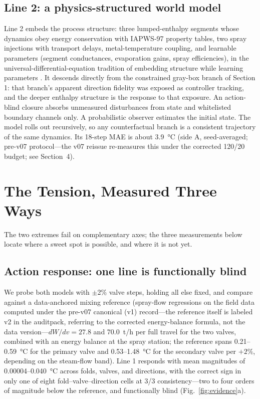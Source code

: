 \documentclass{article}
\begin{document}
\subsection{Line 2: a physics-structured world model}

Line 2 embeds the process structure: three lumped-enthalpy segments whose dynamics
obey energy conservation with IAPWS-97 property tables, two spray injections with
transport delays, metal-temperature coupling, and learnable parameters (segment
conductances, evaporation gains, spray efficiencies), in the
universal-differential-equation tradition of embedding structure while learning
parameters \cite{chen2018neuralode, rackauckas2020ude}. It descends directly from the
constrained gray-box branch of Section 1: that branch's apparent direction fidelity
was exposed as controller tracking, and the deeper enthalpy structure is the response
to that exposure. An action-blind closure absorbs unmeasured disturbances from state
and whitelisted boundary channels only. A probabilistic observer estimates the
initial state. The model rolls out recursively, so any counterfactual branch is a
consistent trajectory of the same dynamics. Its 18-step MAE is about
3.9~\si{\degreeCelsius} (side A, seed-averaged; pre-v07 protocol---the v07 reissue
re-measures this under the corrected 120/20 budget; see Section~4).

\section{The Tension, Measured Three Ways}

The two extremes fail on complementary axes; the three measurements below locate
where a sweet spot is possible, and where it is not yet.

\subsection{Action response: one line is functionally blind}

We probe both models with $\pm$2\% valve steps, holding all else fixed, and compare
against a data-anchored mixing reference (spray-flow regressions on the field data
computed under the pre-v07 canonical (v1) record---the reference itself is labeled
v2 in the auditpack, referring to the corrected energy-balance formula, not the data
version---$dW/dv = 27.8$ and $70.0$~t/h per full travel for the two valves, combined with an
energy balance at the spray station; the reference spans 0.21--0.59~\si{\degreeCelsius}
for the primary valve and 0.53--1.48~\si{\degreeCelsius} for the secondary valve per
$+2\%$, depending on the steam-flow band). Line 1 responds with mean magnitudes of
0.00004--0.040~\si{\degreeCelsius} across folds, valves, and directions, with the
correct sign in only one of eight fold--valve--direction cells at 3/3
consistency---two to four orders of magnitude below the reference, and functionally
blind (Fig.~\ref{fig:evidence}a).
\end{document}
